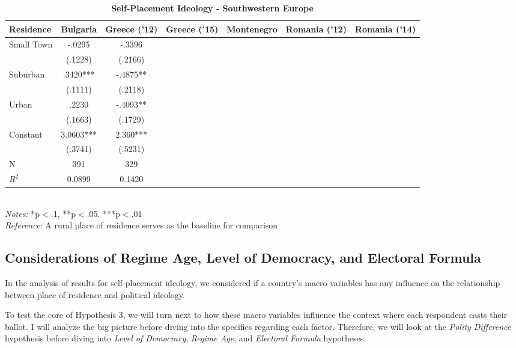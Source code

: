 \documentclass[12pt, titlepage]{article}
\newcommand\e{\emph}
\newcommand\tb{\textbf}
\begin{document}
\begin{landscape}
	\begin{table}
		\centering
		\def\arraystretch{1.5}
		\caption{\tb{Self-Placement Ideology - Southwestern Europe}}
		\begin{tabulary}{\linewidth}{l c c c c c c}
			\\
			\hline
			\tb{Residence}& \tb{Bulgaria}& \tb{Greece ('12)}& \tb{Greece ('15)} & \tb{Montenegro} & \tb{Romania ('12)} & \tb {Romania ('14)}\\
			\hline
			Small Town& -.0295&-.3396 & & & &  \\
			&(.1228) &(.2166)  &  &  &  &   \\
			Suburban& .3420***&-.4875** &  &  &  &  \\
			&(.1111)& (.2118)  &  &  &  & \\
			Urban&.2230& -.4093** &  &  &  &  \\
			&(.1663)& (.1729) &   &   &  &   \\
			Constant&3.0603***&2.360***  &  &  &  &  \\
			&(.3741)& (.5231)  &  &  &  &  \\
			N&391 & 329  &   &  &   &  \\
			$R^2$&0.0899& 0.1420  &  &  &  &  \\
			\hline
\end{tabulary}
\\
\e{Notes:} *p$<$.1, **p$<$.05. ***p$<$.01 \\
\e{Reference:} A rural place of residence serves as the baseline for comparison
\label{SWELib}
\end{table}
\end{landscape}

\subsection{Considerations of Regime Age, Level of Democracy, and Electoral Formula}

In the analysis of results for self-placement ideology, we considered if a country's macro variables has any influence on the relationship between place of residence and political ideology.

To test the core of Hypothesis 3, we will turn next to how these macro variables influence the context where each respondent casts their ballot. I will analyze the big picture before diving into the specifics regarding each factor. Therefore, we will look at the \e{Polity Difference} hypothesis before diving into \e{Level of Democracy}, \e{Regime Age}, and \e{Electoral Formula} hypotheses.
\end{document}
